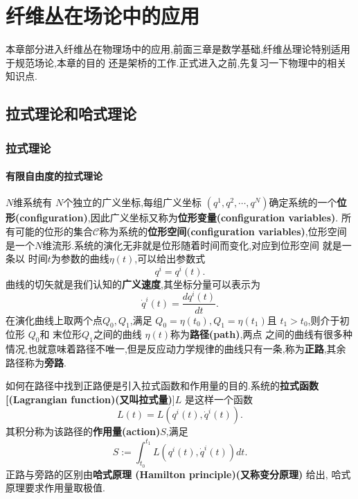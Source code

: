 \documentclass[../main.tex]{subfiles}
\begin{document}
 \hypersetup{pageanchor=true}
\part{纤维丛在场论中的应用}
 本章部分进入纤维丛在物理场中的应用,前面三章是数学基础,纤维丛理论特别适用于规范场论,本章的目的
 还是架桥的工作.正式进入之前,先复习一下物理中的相关知识点.
 \chapter{拉式理论和哈式理论}
 \section{拉式理论}
 \subsection{有限自由度的拉式理论}
 $N$维系统有 $N$个独立的广义坐标,每组广义坐标 $(q^1,q^2,\cdots,q^N)$确定系统的一个\textbf{位形(configuration)},因此广义坐标又称为\textbf{位形变量(configuration variables)}.
 所有可能的位形的集合$\mathscr{C}$称为系统的\textbf{位形空间(configuration variables)},位形空间是一个$N$维流形.系统的演化无非就是位形随着时间而变化,对应到位形空间
 就是一条以 时间$t$为参数的曲线$\eta(t)$,可以给出参数式 \[q^i = q^i(t).\]曲线的切矢就是我们认知的\textbf{广义速度},其坐标分量可以表示为 \[
 \dot{q}^i(t) = \frac{d q^i(t)}{dt}
 .\] 
 在演化曲线上取两个点$Q_0,Q_1$,满足 $Q_0 = \eta(t_0), Q_1 = \eta(t_1)$且 $t_1>t_0$,则介于初位形 $Q_0$和 末位形$Q_1$之间的曲线 $\eta(t)$称为\textbf{路径(path)},两点
 之间的曲线有很多种情况,也就意味着路径不唯一,但是反应动力学规律的曲线只有一条,称为\textbf{正路},其余路径称为\textbf{旁路}. 

 如何在路径中找到正路便是引入拉式函数和作用量的目的.系统的\textbf{拉式函数[(Lagrangian function)(又叫拉式量)}]$L$ 是这样一个函数\[
 L(t) = L(q^i(t), \dot{q}^i(t))
 .\] 
 其积分称为该路径的\textbf{作用量(action)}$S$,满足 \[
 S := \int^{t_1}_{t_0} L(q^i(t), \dot{q}^i(t))dt
 .\] 
 正路与旁路的区别由\textbf{哈式原理 (Hamilton principle)(又称变分原理)} 给出, 哈式原理要求作用量取极值.
\end{document}
